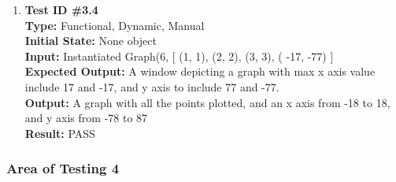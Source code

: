 \documentclass[12pt, titlepage]{article}
\begin{document}
\begin{enumerate}
			\item{\textbf{Test ID \#3.4\\}}
			\textbf{Type:} Functional, Dynamic, Manual\\
			\textbf{Initial State:}  None object\\
			\textbf{Input:} Instantiated Graph(6, [ (1, 1),  (2, 2), (3, 3), ( -17, -77) ]\\
			\textbf{Expected Output:} A window depicting a graph with max x axis value include 17 and -17, and y axis to include 77 and -77. \\
			\textbf{Output:}	A graph with all the points plotted, and an x axis from -18 to 18, and y axis from -78 to 87\\
			\textbf{Result:} PASS
	\end{enumerate}

\subsubsection{Area of Testing 4}
\end{document}
